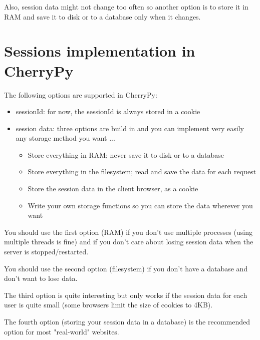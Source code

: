 \documentclass{manual}
\begin{document}
Also, session data might not change too often so another option is to store it in RAM and save it to disk or to a
database only when it changes.

\section{Sessions implementation in CherryPy}
The following options are supported in CherryPy:

\begin{itemize}
\item
sessionId: for now, the sessionId is always stored in a cookie
\item
session data: three options are build in and you can implement very easily any storage method you want ...
    \begin{itemize}
    \item
    Store everything in RAM; never save it to disk or to a database
    \item
    Store everything in the filesystem; read and save the data for each request
    \item
    Store the session data in the client browser, as a cookie
    \item
    Write your own storage functions so you can store the data wherever you want
    \end{itemize}
\end{itemize}
You should use the first option (RAM) if you don't use multiple processes (using multiple threads is fine) and if you don't care about losing session data when the server is stopped/restarted.

You should use the second option (filesystem) if you don't have a database and don't want to lose data.

The third option is quite interesting but only works if the session data for each user is quite small (some browsers limit the size of cookies to 4KB).

The fourth option (storing your session data in a database) is the recommended option for most "real-world" websites.
\end{document}
